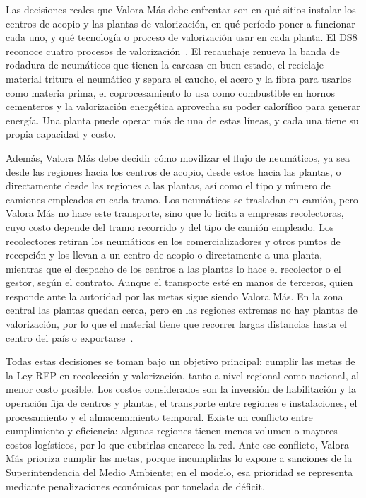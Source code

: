 \documentclass[letterpaper]{article}
\begin{document}
Las decisiones reales que Valora Más debe enfrentar son en qué sitios instalar los centros de acopio y las plantas de valorización, en qué período poner a funcionar cada uno, y qué tecnología o proceso de valorización usar en cada planta. El DS8 reconoce cuatro procesos de valorización~\cite{DS8}. El recauchaje renueva la banda de rodadura de neumáticos que tienen la carcasa en buen estado, el reciclaje material tritura el neumático y separa el caucho, el acero y la fibra para usarlos como materia prima, el coprocesamiento lo usa como combustible en hornos cementeros y la valorización energética aprovecha su poder calorífico para generar energía. Una planta puede operar más de una de estas líneas, y cada una tiene su propia capacidad y costo.

Además, Valora Más debe decidir cómo movilizar el flujo de neumáticos, ya sea desde las regiones hacia los centros de acopio, desde estos hacia las plantas, o directamente desde las regiones a las plantas, así como el tipo y número de camiones empleados en cada tramo. Los neumáticos se trasladan en camión, pero Valora Más no hace este transporte, sino que lo licita a empresas recolectoras, cuyo costo depende del tramo recorrido y del tipo de camión empleado. Los recolectores retiran los neumáticos en los comercializadores y otros puntos de recepción y los llevan a un centro de acopio o directamente a una planta, mientras que el despacho de los centros a las plantas lo hace el recolector o el gestor, según el contrato. Aunque el transporte esté en manos de terceros, quien responde ante la autoridad por las metas sigue siendo Valora Más. En la zona central las plantas quedan cerca, pero en las regiones extremas no hay plantas de valorización, por lo que el material tiene que recorrer largas distancias hasta el centro del país o exportarse~\cite{paiscircular2026}.

Todas estas decisiones se toman bajo un objetivo principal: cumplir las metas de la Ley REP en recolección y valorización, tanto a nivel regional como nacional, al menor costo posible. Los costos considerados son la inversión de habilitación y la operación fija de centros y plantas, el transporte entre regiones e instalaciones, el procesamiento y el almacenamiento temporal. Existe un conflicto entre cumplimiento y eficiencia: algunas regiones tienen menos volumen o mayores costos logísticos, por lo que cubrirlas encarece la red. Ante ese conflicto, Valora Más prioriza cumplir las metas, porque incumplirlas lo expone a sanciones de la Superintendencia del Medio Ambiente; en el modelo, esa prioridad se representa mediante penalizaciones económicas por tonelada de déficit.
\end{document}

